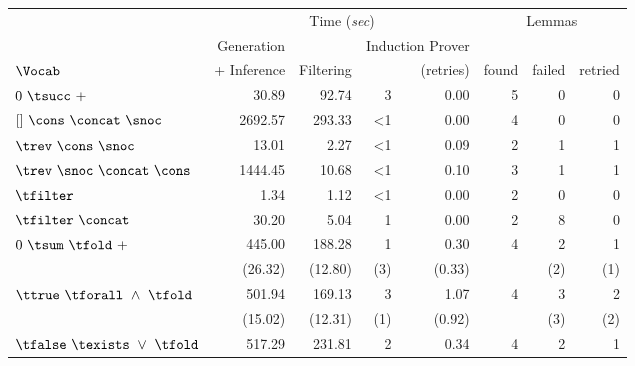 \begin{tabular}{|l|r|r|rr|rrr|}
\hline
          & \multicolumn{4}{c|}{Time (\textit{sec})}                           & \multicolumn{3}{c|}{Lemmas} \\
          &  Generation  &             & \multicolumn{2}{c|}{Induction Prover} & & &        \\
$\Vocab$  &  + Inference &   Filtering & \hspace{1cm}  & {\small(retries)}     & found\!\! & failed\!\! & retried\!\!    \\ \hline
$0~\tsucc~+$                                  &         30.89  &        92.74     &            3     &         0.00     &      5 &     0 &      0  \\
\hline
$[]~\cons~\concat~\snoc$                      &       2692.57  &       293.33     &           <1     &         0.00     &      4 &     0 &      0  \\
\hline
$\trev~\cons~\snoc$                           &         13.01  &         2.27     &           <1     &         0.09     &      2 &     1 &      1  \\
\hline
$\trev~\snoc~\concat~\cons$                   &       1444.45  &        10.68     &           <1     &         0.10     &      3 &     1 &      1  \\
\hline
$\tfilter$                                    &          1.34  &         1.12     &           <1     &         0.00     &      2 &     0 &      0  \\
\hline
$\tfilter~\concat$                            &         30.20  &         5.04     &            1     &         0.00     &      2 &     8 &      0  \\
\hline
$0~\tsum~\tfold~+$                            &        445.00  &       188.28     &            1     &         0.30     &      4 &     2 &      1  \\
                                              &         (26.32)  &        (12.80)     &            (3)     &         (0.33)     &        &     (2) &      (1)  \\
\hline
$\ttrue~\tforall~\land~\tfold$                &        501.94  &       169.13     &            3     &         1.07     &      4 &     3 &      2  \\
                                              &         (15.02)  &        (12.31)     &            (1)     &         (0.92)     &        &     (3) &      (2)  \\
\hline
$\tfalse~\texists~\lor~\tfold$                &        517.29  &       231.81     &            2     &         0.34     &      4 &     2 &      1  \\

\end{tabular}
